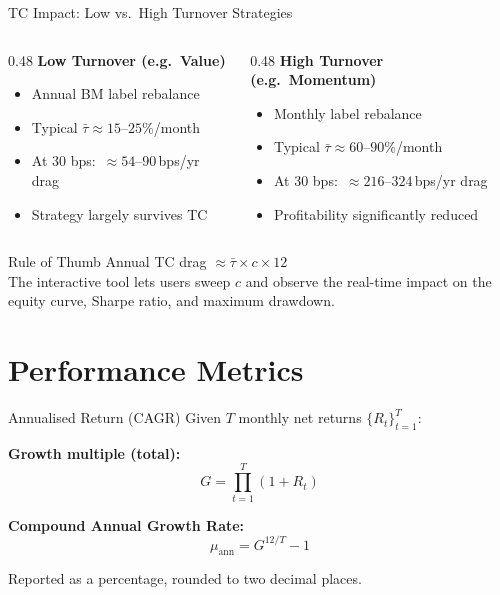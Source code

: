 \documentclass[aspectratio=169, 12pt]{beamer}
\begin{document}
\begin{frame}{TC Impact: Low vs.\ High Turnover Strategies}
  \begin{columns}[T]
    \begin{column}{0.48\textwidth}
      {\color{accent}\textbf{Low Turnover (e.g.\ Value)}}
      \begin{itemize}
        \item Annual BM label rebalance
        \item Typical $\bar{\tau} \approx 15$--$25\%$/month
        \item At 30 bps:\, $\approx\! 54$--$90$\,bps/yr drag
        \item Strategy largely survives TC
      \end{itemize}
    \end{column}
    \begin{column}{0.48\textwidth}
      {\color{danger}\textbf{High Turnover (e.g.\ Momentum)}}
      \begin{itemize}
        \item Monthly label rebalance
        \item Typical $\bar{\tau} \approx 60$--$90\%$/month
        \item At 30 bps:\, $\approx\!216$--$324$\,bps/yr drag
        \item Profitability significantly reduced
      \end{itemize}
    \end{column}
  \end{columns}

  \vspace{8pt}
  \begin{alertblock}{Rule of Thumb}
    Annual TC drag $\approx \bar{\tau} \times c \times 12$\\
    The interactive tool lets users sweep $c$ and observe the real-time impact
    on the equity curve, Sharpe ratio, and maximum drawdown.
  \end{alertblock}
\end{frame}

\section{Performance Metrics}

\begin{frame}{Annualised Return (CAGR)}
  Given $T$ monthly net returns $\{R_t\}_{t=1}^{T}$:

  \medskip
  \textbf{Growth multiple (total):}
  \[
    G = \prod_{t=1}^{T}(1 + R_t)
  \]

  \textbf{Compound Annual Growth Rate:}
  \[
    \mu_{\text{ann}} = G^{12/T} - 1
  \]

  Reported as a percentage, rounded to two decimal places.
\end{frame}
\end{document}
